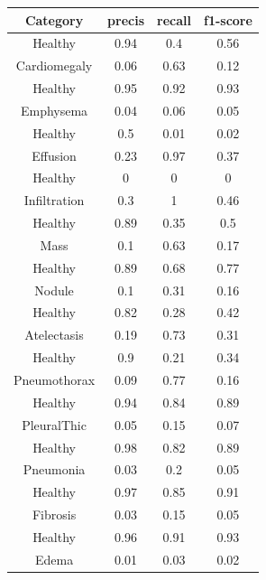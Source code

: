 \documentclass{article}
\begin{document}
    \begin{center}
        \begin{tabular}{||c c c c||}
            \hline
            Category&precis&recall&f1-score \\ 
            \hline
            Healthy&0.94&0.4&0.56 \\
            Cardiomegaly&0.06&0.63&0.12 \\ 
            \hline
            Healthy&0.95&0.92&0.93 \\
            Emphysema&0.04&0.06&0.05 \\ 
            \hline
            Healthy&0.5&0.01&0.02 \\
            Effusion&0.23&0.97&0.37 \\ 
            \hline
            Healthy&0&0&0 \\
            Infiltration&0.3&1&0.46 \\ 
            \hline
            Healthy&0.89&0.35&0.5 \\
            Mass&0.1&0.63&0.17 \\ 
            \hline
            Healthy&0.89&0.68&0.77 \\
            Nodule&0.1&0.31&0.16 \\ 
            \hline
            Healthy&0.82&0.28&0.42 \\
            Atelectasis&0.19&0.73&0.31 \\ 
            \hline
            Healthy&0.9&0.21&0.34 \\
            Pneumothorax&0.09&0.77&0.16 \\ 
            \hline
            Healthy&0.94&0.84&0.89 \\
            PleuralThic&0.05&0.15&0.07 \\ 
            \hline
            Healthy&0.98&0.82&0.89 \\
            Pneumonia&0.03&0.2&0.05 \\ 
            \hline
            Healthy&0.97&0.85&0.91 \\
            Fibrosis&0.03&0.15&0.05 \\ 
            \hline
            Healthy&0.96&0.91&0.93 \\
            Edema&0.01&0.03&0.02 \\ 
            \hline
        \end{tabular}
    \end{center}
\end{document}
